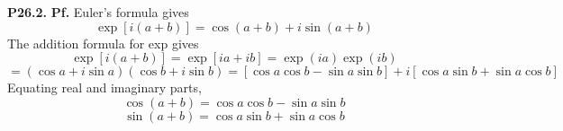 \documentclass{article}
\def\tbf#1{\textbf{#1}}
\newcommand{\pf}{\tbf{Pf. }}
\begin{document}
\tbf{P26.2.} \pf Euler's formula gives
$$\exp[i(a+b)] = \cos(a+b) + i\sin(a+b)$$
The addition formula for exp gives
$$\exp[i(a+b)] = \exp[ia+ib]
= \exp(ia)\exp(ib)$$
$$= (\cos a+i\sin a)(\cos b+i\sin b)
= [\cos a\cos b - \sin a\sin b] + i[\cos a\sin b + \sin a\cos b]$$
Equating real and imaginary parts,
$$\cos(a+b) = \cos a\cos b - \sin a\sin b$$
$$\sin(a+b) = \cos a\sin b + \sin a\cos b$$
	
\end{document}
